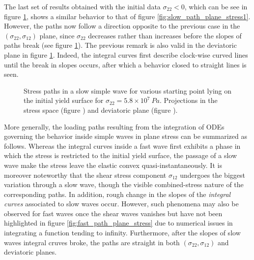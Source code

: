 The last set of results obtained with the initial data $\sigma_{22}<0$, which can be see in figure \ref{fig:slow_path_plane_stress3}, shows a similar behavior to that of figure \ref{fig:slow_path_plane_stress1}.
However, the paths now follow a direction opposite to the previous case in the $(\sigma_{22},\sigma_{12})$ plane, since $\sigma_{22}$ decreases rather than increases before the slopes of paths break (see figure \ref{fig:slow_path_plane_stress3}).
The previous remark is also valid in the deviatoric plane in figure \ref{fig:slow_path_plane_stress3}.
Indeed, the integral curves first describe clock-wise curved lines until the break in slopes occurs, after which a behavior closed to straight lines is seen.
\begin{figure}[h!]
  \centering
  \caption{Stress paths in a slow simple wave for various starting point lying on the initial yield surface for $\sigma_{22}=5.8\times 10^7 \: Pa$. Projections in the stress space (figure ) and deviatoric plane (figure ).}
  \label{fig:slow_path_plane_stress3}
\end{figure}

More generally, the loading paths resulting from the integration of ODEs governing the behavior inside simple waves in plane stress can be summarized as follows.
Whereas the integral curves inside a fast wave first exhibits a phase in which the stress is restricted to the initial yield surface, the passage of a slow wave make the stress leave the elastic convex quasi-instantaneously.
It is moreover noteworthy that the shear stress component $\sigma_{12}$ undergoes the biggest variation through a slow wave, though the visible combined-stress nature of the corresponding paths.
In addition, rough change in the slopes of the \textit{integral curves} associated to slow waves occur.
However, such phenomena may also be observed for fast waves once the shear waves vanishes but have not been highlighted in figure \ref{fig:fast_path_plane_stress} due to numerical issues in integrating a function tending to infinity.
Furthermore, after the slopes of slow waves integral cruves broke, the paths are straight in both $(\sigma_{22},\sigma_{12})$ and deviatoric planes.

